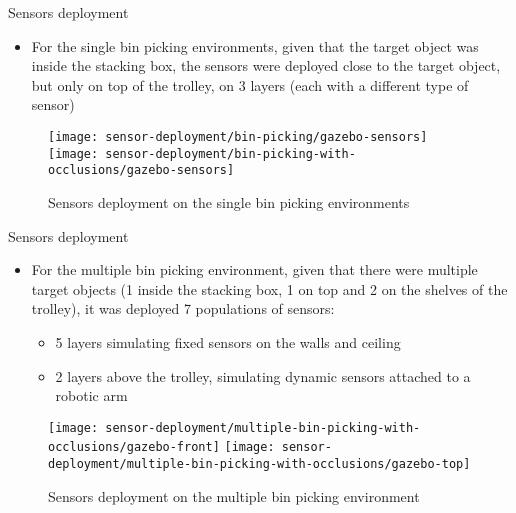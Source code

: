 \begin{frame}{Sensors deployment}
	\begin{itemize}
		\item For the single bin picking environments, given that the target object was inside the stacking box, the sensors were deployed close to the target object, but only on top of the trolley, on 3 layers (each with a different type of sensor)
	\end{itemize}
	\begin{figure}
		\centering
		\texttt{[image: sensor-deployment/bin-picking/gazebo-sensors]}
		\texttt{[image: sensor-deployment/bin-picking-with-occlusions/gazebo-sensors]}
		\caption{Sensors deployment on the single bin picking environments}
	\end{figure}
\end{frame}

\begin{frame}{Sensors deployment}
	\begin{itemize}
		\item For the multiple bin picking environment, given that there were multiple target objects (1 inside the stacking box, 1 on top and 2 on the shelves of the trolley), it was deployed 7 populations of sensors:
		\begin{itemize}
			\item 5 layers simulating fixed sensors on the walls and ceiling
			\item 2 layers above the trolley, simulating dynamic sensors attached to a robotic arm
		\end{itemize}
	\end{itemize}
	\begin{figure}
		\centering
		\texttt{[image: sensor-deployment/multiple-bin-picking-with-occlusions/gazebo-front]}\hspace{2em}
		\texttt{[image: sensor-deployment/multiple-bin-picking-with-occlusions/gazebo-top]}
		\caption{Sensors deployment on the multiple bin picking environment}
	\end{figure}
\end{frame}
